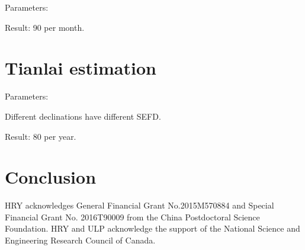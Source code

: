\documentclass[]{raa}
\begin{document}
Parameters:



Result: 90 per month.

\section{Tianlai estimation}\label{sec.Tianlai}

Parameters:

Different declinations have different SEFD.

Result: 80 per year.

\section{Conclusion}\label{sec.conclusion}

\begin{acknowledgements}
HRY acknowledges General Financial Grant No.2015M570884 and
Special Financial Grant No. 2016T90009 from the China
Postdoctoral Science Foundation.
HRY and ULP acknowledge the support of the
National Science and Engineering Research Council of Canada.
\end{acknowledgements}



\end{document}
